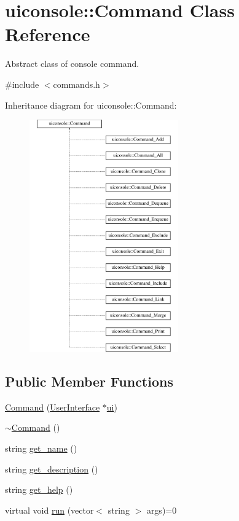 \hypertarget{classuiconsole_1_1Command}{
\section{uiconsole::Command Class Reference}
\label{dc/df0/classuiconsole_1_1Command}
}


Abstract class of console command.  




{\ttfamily \#include $<$commands.h$>$}

Inheritance diagram for uiconsole::Command:\begin{figure}[H]
\begin{center}
\leavevmode
\includegraphics[height=10.000000cm]{dc/df0/classuiconsole_1_1Command}
\end{center}
\end{figure}
\subsection*{Public Member Functions}
\begin{DoxyCompactItemize}
\item 
\hyperlink{classuiconsole_1_1Command_a4f28955b8a36ef1d3b4402b081346060}{Command} (\hyperlink{classUserInterface}{UserInterface} $\ast$\hyperlink{classuiconsole_1_1Command_ab43ed5152860c099f858d62f9f556699}{ui})
\item 
\hyperlink{classuiconsole_1_1Command_a11421d325715cfc8f1e779ef823b3445}{$\sim$Command} ()
\item 
string \hyperlink{classuiconsole_1_1Command_a64d37b0931d5ba0a35d535a6f5a443f3}{get\_\-name} ()
\item 
string \hyperlink{classuiconsole_1_1Command_abcc8cf2d95618e990449e41b510c3fdc}{get\_\-description} ()
\item 
string \hyperlink{classuiconsole_1_1Command_a79b882f32e4ed531f950b0030e2d4998}{get\_\-help} ()
\item 
virtual void \hyperlink{classuiconsole_1_1Command_a5c4d205b1de13a6b3d0db73ddc7ebefa}{run} (vector$<$ string $>$ args)=0
\end{DoxyCompactItemize}
